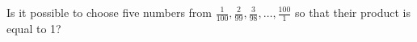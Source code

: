 \problem
Is it possible to choose five numbers from
$\frac{1}{100}, \frac{2}{99}, \frac{3}{98}, \ldots, \frac{100}{1}$
so that their product is equal to 1?
\solution
\endproblem
